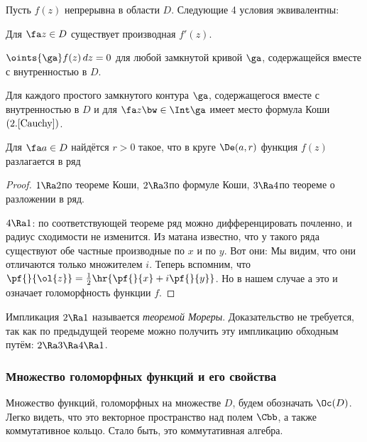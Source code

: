 \documentclass[a4paper]{article}
\begin{document}
\begin{theorem}
Пусть $f(z)$ непрерывна в области $D$. Следующие 4 условия эквивалентны:
\begin{nums}{-1}
\item Для $\fa z\in D$ существует производная $f'(z)$.
\item $\oints{\ga}f(z)\,dz=0$ для любой замкнутой кривой $\ga$, содержащейся вместе с внутренностью в $D$.
\item Для каждого простого замкнутого контура $\ga$, содержащегося вместе с внутренностью в $D$ и для $\fa z\bw\in \Int \ga$
имеет место формула Коши $(2.\ref{Cauchy})$.
\item Для $\fa a \in D$ найдётся $r > 0$ такое, что в круге $\De(a,r)$ функция $f(z)$ разлагается в ряд
\end{nums}
\end{theorem}
\begin{proof}
$1 \Ra 2$\т по теореме Коши, $2 \Ra 3$\т по формуле Коши, $3\Ra4$\т по теореме о разложении в ряд.

$4 \Ra 1$: по соответствующей теореме ряд можно дифференцировать почленно, и радиус сходимости не изменится.
Из матана известно, что у такого ряда существуют обе частные производные по $x$ и по $y$.
Вот они:
Мы видим, что они отличаются только множителем $i$. Теперь вспомним, что $\pf{}{\ol{z}}= \frac12\hr{\pf{}{x}+ i\pf{}{y}}$.
Но в нашем случае
а это и означает голоморфность функции $f$.
\end{proof}

\begin{note}
Импликация $2 \Ra 1$ называется \emph{теоремой Мореры}. Доказательство не требуется, так как по предыдущей теореме
можно получить эту импликацию обходным путём: $2 \Ra 3 \Ra 4 \Ra 1$.
\end{note}

\subsubsection{Множество голоморфных функций и его свойства}

Множество функций, голоморфных на множестве $D$, будем обозначать $\Oc(D)$.
Легко видеть, что это векторное пространство над полем $\Cbb$, а также коммутативное кольцо.
Стало быть, это коммутативная алгебра.
\end{document}
